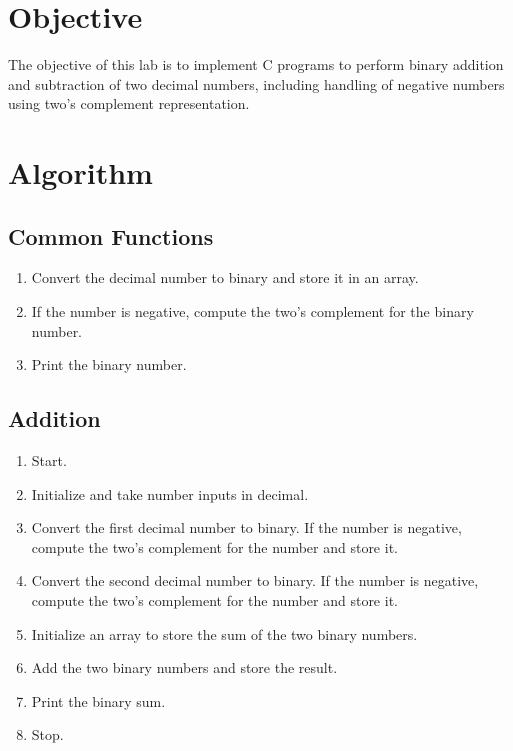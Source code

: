 \documentclass[a4paper,12pt]{article}
\begin{document}
\section*{Objective}
The objective of this lab is to implement C programs to perform binary addition and subtraction of two decimal numbers, including handling of negative numbers using two's complement representation.

\section*{Algorithm}

\subsection*{Common Functions}
\begin{enumerate}
    \item Convert the decimal number to binary and store it in an array.
    \item If the number is negative, compute the two's complement for the binary number.
    \item Print the binary number.
\end{enumerate}

\subsection*{Addition}
\begin{enumerate}
    \item Start.
    \item Initialize and take number inputs in decimal.
    \item Convert the first decimal number to binary. If the number is negative, compute the two's complement for the number and store it.
    \item Convert the second decimal number to binary. If the number is negative, compute the two's complement for the number and store it.
    \item Initialize an array to store the sum of the two binary numbers.
    \item Add the two binary numbers and store the result.
    \item Print the binary sum.
    \item Stop.
\end{enumerate}
\end{document}
